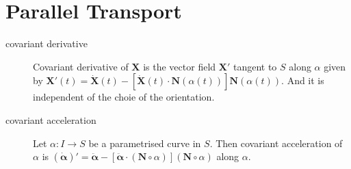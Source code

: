 \section{Parallel Transport}
\begin{description}
	\item[covariant derivative] Covariant derivative of $\mathbf{X}$ is the vector field $\mathbf{X}'$ tangent to $S$ along $\alpha$ given by $\mathbf{X}'(t) = \dot{\mathbf{X}}(t) - [\dot{\mathbf{X}}(t) \cdot \mathbf{N}(\alpha(t))]\mathbf{N}(\alpha(t))$.
		And it is independent of the choie of the orientation.
	\item[covariant acceleration] Let $\alpha : I \to S$ be a parametrised curve in $S$.
		Then covariant acceleration of $\alpha$ is $(\dot{\boldsymbol{\alpha}})' = \ddot{\boldsymbol{\alpha}} - \left[ \ddot{\boldsymbol{\alpha}} \cdot (\mathbf{N} \circ \alpha) \right] (\mathbf{N} \circ \alpha)$ along $\alpha$.
\end{description}
